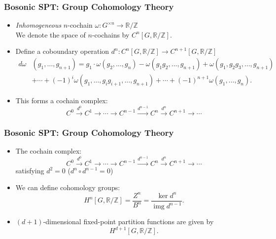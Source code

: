 \documentclass[xcolor=table, aspectratio=169]{beamer}
\newcommand{\uone}{\mathbb R/\mathbb Z}
\DeclareMathOperator{\img}{img}
\begin{document}
\begin{frame}
\frametitle{Bosonic SPT: Group Cohomology Theory}
\begin{itemize}
	\item \emph{Inhomogeneous} $n$-cochain $\omega: G^{\times n}\rightarrow \uone$\\
	We denote the space of $n$-cochains by $C^n[G,\uone]$.
	\item Define a coboundary operation $d^n:C^n[G,\uone]\rightarrow C^{n+1}[G,\uone]$
	\begin{align*}
		d\omega &(g_1,\ldots,g_{n+1})=g_1\cdot \omega(g_2,\ldots,g_n)
		-\omega(g_1g_2,\ldots,g_{n+1})
		+\omega(g_1,g_2g_3,\ldots,g_{n+1})\\
		&+\cdots+(-1)^i\omega(g_1,\ldots,g_ig_{i+1},\ldots,g_{n+1})
		+\cdots + (-1)^{n+1}\omega(g_1,\ldots,g_n).
	\end{align*}
	\item This forms a cochain complex:
	\[C^0\xrightarrow{d^0}C^1\rightarrow\cdots\rightarrow C^{n-1}\xrightarrow{d^{n-1}}C^n\xrightarrow{d^n}C^{n+1}\rightarrow\cdots\]
\end{itemize}
\end{frame}

\begin{frame}
	\frametitle{Bosonic SPT: Group Cohomology Theory}
	\begin{itemize}
		\item The cochain complex:
		\[C^0\xrightarrow{d^0}C^1\rightarrow\cdots\rightarrow C^{n-1}\xrightarrow{d^{n-1}}C^n\xrightarrow{d^n}C^{n+1}\rightarrow\cdots\]
		satisfying $d^2=0$ ($d^n\circ d^{n-1}=0$)
		\item We can define cohomology groups:
		\[H^n[G,\uone] = \frac{Z^n}{B^n} = \frac{\ker d^n}{\img d^{n-1}}.\]
		\item $(d+1)$-dimensional fixed-point partition functions are given by
		\[H^{d+1}[G,\uone].\]
	\end{itemize}
\end{frame}
\end{document}

